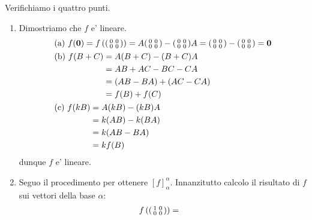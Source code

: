\begin{solution}
    Verifichiamo i quattro punti.
    \begin{enumerate}
        \item Dimostriamo che $f$ e' lineare.
            \begin{alignat*}{2}
                &\text{(a) } f(\bm{0}) = f\left(\begin{psmallmatrix}0&0\\0&0\end{psmallmatrix}\right) = A\begin{psmallmatrix}0&0\\0&0\end{psmallmatrix} - \begin{psmallmatrix}0&0\\0&0\end{psmallmatrix}A = \begin{psmallmatrix}0&0\\0&0\end{psmallmatrix} - \begin{psmallmatrix}0&0\\0&0\end{psmallmatrix} = \bm 0 \\
                &\begin{alignedat}{1}
                    \text{(b) } f(B + C) &= A(B + C) - (B + C)A \\
                    &= AB + AC - BC - CA \\
                    &= (AB - BA) + (AC - CA) \\
                    &= f(B) + f(C)
                \end{alignedat}\\
                &\begin{alignedat}{1}
                    \text{(c) } f(kB) &= A(kB) - (kB)A \\
                    &= k(AB) - k(BA) \\
                    &= k(AB - BA) \\
                    &= kf(B)
                \end{alignedat}
            \end{alignat*}
            dunque $f$ e' lineare.
        \item Seguo il procedimento per ottenere $[f]^{\alpha}_{\alpha}$. Innanzitutto calcolo il risultato di $f$ sui vettori della base $\alpha$:
        \begin{alignat*}{1}
            &f\left(\begin{psmallmatrix}1&0\\0&0\end{psmallmatrix}\right) = 

\end{alignat*}
\end{enumerate}
\end{solution}
